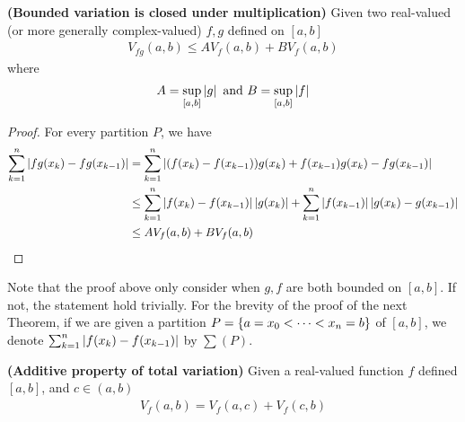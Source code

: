 \documentclass{report}
\begin{document}
\begin{theorem}
\textbf{(Bounded variation is closed under multiplication)} Given two real-valued (or more generally complex-valued) $f,g$  defined on $[a,b]$ 
\begin{align*}
V_{fg}(a,b)\leq AV_f(a,b)+BV_f(a,b)
\end{align*}
where 
\begin{align*}
A=\sup_{[a,b]}\left|g\right|\text{ and }B=\sup_{[a,b]}\left|f\right|
\end{align*}
\end{theorem}
\begin{proof}
For every partition $P$, we have 
 \begin{align*}
\sum_{k=1}^n \left|fg(x_k)-fg(x_{k-1})\right|&= \sum_{k=1}^n \left|(f(x_k)-f(x_{k-1}))g(x_k)+f(x_{k-1})g(x_k)-fg(x_{k-1})\right|\\
&\leq \sum_{k=1}^n \left|f(x_k)-f(x_{k-1})\right|\left|g(x_k)\right|+ \sum_{k=1}^n \left|f(x_{k-1})\right| \left|g(x_k)-g(x_{k-1})\right|\\
&\leq AV_f(a,b)+ BV_f(a,b)
\end{align*}
\end{proof}
\begin{mdframed}
Note that the proof above only consider when $g,f$ are both bounded on  $[a,b]$. If not, the statement hold trivially. For the brevity of the proof of the next Theorem,  if we are given a partition $P=\{ a=x_0< \cdots <x_n=b \}$ of $[a,b]$, we denote $\sum_{k=1}^n \left|f(x_k)-f(x_{k-1})\right|$ by $\sum  (P)$. 
\end{mdframed}
\begin{theorem}
\label{Apotv}
\textbf{(Additive property of total variation)} Given a real-valued function $f$  defined $[a,b]$, and $c \in (a,b)$  
\begin{align*}
V_f(a,b)=V_f(a,c)+V_f(c,b)
\end{align*}
\end{theorem}
\end{document}
